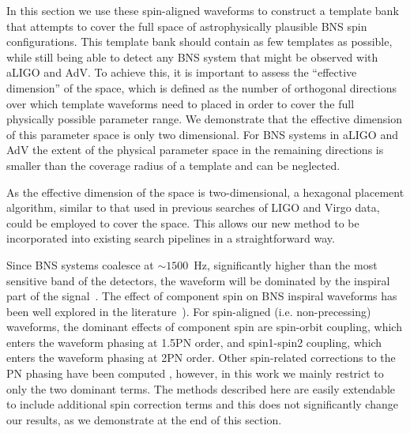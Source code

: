 In this section we use these spin-aligned waveforms to construct a template
bank that attempts to cover the full space of astrophysically plausible BNS
spin configurations. This template bank should contain as few templates as
possible, while still being able to detect any BNS system that might be
observed with aLIGO and AdV. To achieve this, it is important to assess the
``effective dimension'' of the space, which is defined as the number of orthogonal
directions
over which template waveforms need to placed in order to cover the full physically
possible parameter range. 
We demonstrate that the effective dimension
of this parameter space is only two dimensional. For BNS systems in aLIGO and AdV
the extent of the physical parameter space in the remaining directions is smaller
than the coverage radius of a template and can be neglected.

As the effective dimension of the space is two-dimensional, a
hexagonal placement algorithm, similar to that used in previous searches of
LIGO and Virgo data, could be employed to cover the space. This allows our new
method to be incorporated into existing search pipelines in a straightforward
way.


Since BNS systems coalesce at $\sim 1500$~Hz, significantly higher than the
most sensitive band of the detectors, the waveform will be dominated by the
inspiral part of the signal~\cite{Buonanno:2009zt}.  The effect of component
spin on BNS inspiral waveforms has been well explored in the
literature~\cite{Apostolatos:1994mx,Kidder:1992fr,Kidder:1995zr,BCV03b}).
For spin-aligned (i.e. non-precessing) waveforms, the dominant effects of
component spin are spin-orbit coupling, which enters the waveform phasing at
1.5PN order, and spin1-spin2 coupling, which enters the waveform phasing at
2PN order.  Other spin-related corrections to the PN phasing have been
computed \cite{Mikoczi:2005dn,Arun:2008kb}, however, in this work we mainly restrict
to only the two dominant terms. The methods described here are easily
extendable to include additional spin correction terms and this does not
significantly change our results, as we demonstrate at the end of this section.

